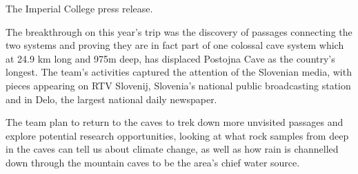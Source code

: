 \begin{marginfigure}
\checkoddpage \ifoddpage \forcerectofloat \else \forceversofloat \fi
\centering
 \caption{The Imperial College press release.}
 \label{connection press release screenshot}
\end{marginfigure}

The breakthrough on this year’s trip was the discovery of passages connecting the two systems and proving they are in fact part of one colossal cave system which at 24.9 km long and 975m deep, has displaced Postojna Cave as the country’s longest.  The team’s activities captured the attention of the Slovenian media, with pieces appearing on RTV Slovenij, Slovenia’s national public broadcasting station and in Delo, the largest national daily newspaper.

The team plan to return to the caves to trek down more unvisited passages and explore potential research opportunities, looking at what rock samples from deep in the caves can tell us about climate change, as well as how rain is channelled down through the mountain caves to be the area’s chief water source.

